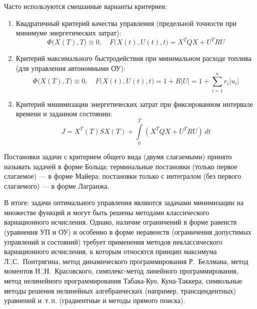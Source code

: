 \documentclass[preprint,russian,a5paper,10pt,twoside]{ncc}
\begin{document}
Часто используются смешанные варианты критериев:
\begin{enumerate}[resume]
\item Квадратичный критерий качества управления (предельной точности при минимуме энергетических затрат):
\[ \Phi \bigl( X(T), T \bigr) \equiv 0, \quad F \bigl( X(t), U(t), t \bigr) = X^TQX + U^TRU \]
\item Критерий максимального быстродействия при минимальном расходе топлива (для управления автономными ОУ):
\[ \Phi \bigl( X(T), T \bigr) \equiv 0, \quad F \bigl( X(t), U(t), t \bigr) = 1 + R\left|U\right| = 1 + \sum\limits_{i=1}^{n}{ r_i \left| u_i \right| } \]
\item Критерий минимизации энергетических затрат при фиксированном интервале времени и заданном состоянии: 
\[ J = X^T \left( T \right) S X \left( T \right) + \int\limits_0^T \left( X^TQX + U^TRU \right) \, dt \] 
\end{enumerate}

Постановки задачи с критерием общего вида (двумя слагаемыми) принято называть задачей в форме Больца; терминальные постановки (только первое слагаемое) --- в форме Майера; постановки только с интегралом (без первого слагаемого) --- в форме Лагранжа.

В итоге: задачи оптимального управления являются задачами минимизации на множестве функций и могут быть решены методами классического вариационного исчисления. Однако, наличие ограничений в форме равенств (уравнения УП и ОУ) и особенно в форме неравенств (ограничения допустимых управлений и состояний) требует применения методов неклассического вариационного исчисления, к которым относятся принцип максимума Л.\=,С.~Понтрягина, метод динамического программирования Р.~Беллмана, метод моментов Н.\=,Н.~Красовского, симплекс-метод линейного программирования, метод нелинейного программирования Табака-Куо, Куна-Таккера, символьные методы решения нелинейных алгебраических (например, трансцендентных) уравнений и~т.\,п. (градиентные и методы прямого поиска).





\clearpage
\end{document}
